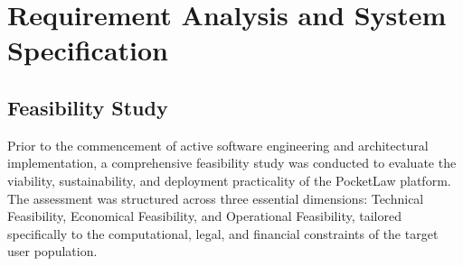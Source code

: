 \chapter{Requirement Analysis and System Specification}
\label{chap:requirements}

\section{Feasibility Study}
\label{sec:feasibility_study}

Prior to the commencement of active software engineering and architectural implementation, a comprehensive feasibility study was conducted to evaluate the viability, sustainability, and deployment practicality of the PocketLaw platform. The assessment was structured across three essential dimensions: Technical Feasibility, Economical Feasibility, and Operational Feasibility, tailored specifically to the computational, legal, and financial constraints of the target user population.

